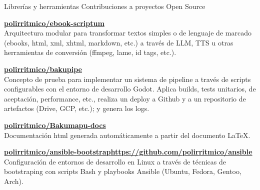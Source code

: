 \begin{cventries}

  \cventry
    {Librerías y herramientas} %
    {Contribuciones a proyectos Open Source} %
    {} %
    {} %
    {
    \begin{cvitems} %
      \item {\textbf{\href{https://github.com/polirritmico/ebook-scriptum}{polirritmico/ebook-scriptum}}\\ Arquitectura modular para transformar textos simples o de lenguaje de marcado (ebooks, html, xml, xhtml, markdown, etc.) a través de LLM, TTS u otras herramientas de conversión (ffmpeg, lame, id tags, etc.).}
      \item {\textbf{\href{https://github.com/polirritmico/bakupipe}{polirritmico/bakupipe}}\\ Concepto de prueba para implementar un sistema de pipeline a través de scripts configurables con el entorno de desarrollo Godot. Aplica builds, tests unitarios, de aceptación, performance, etc., realiza un deploy a Github y a un repositorio de artefactos (Drive, GCP, etc.); y genera los logs.}
      \item {\textbf{\href{https://github.com/polirritmico/Bakumapu-docs}{polirritmico/Bakumapu-docs}}\\ Documentación html generada automáticamente a partir del documento LaTeX.}
      \item {\textbf{\href{https://github.com/polirritmico/ansible-bootstrap}{polirritmico/ansible-bootstrap}\href{https://github.com/polirritmico/ansible}{https://github.com/polirritmico/ansible}}\\ Configuración de entornos de desarrollo en Linux a través de técnicas de bootstraping con scripts Bash y playbooks Ansible (Ubuntu, Fedora, Gentoo, Arch).}
    \end{cvitems}
    }


\end{cventries}
